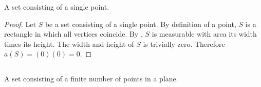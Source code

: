 \documentclass{report}
\begin{document}
A set consisting of a single point.

\begin{proof}

  Let $S$ be a set consisting of a single point.
  By definition of a point, $S$ is a rectangle in which all vertices coincide.
  By , $S$ is measurable with area its width times
    its height.
  The width and height of $S$ is trivially zero.
  Therefore $a(S) = (0)(0) = 0$.

\end{proof}

\subsection{}%
\label{sub:exercise-1.7.1b}

A set consisting of a finite number of points in a plane.
\end{document}
